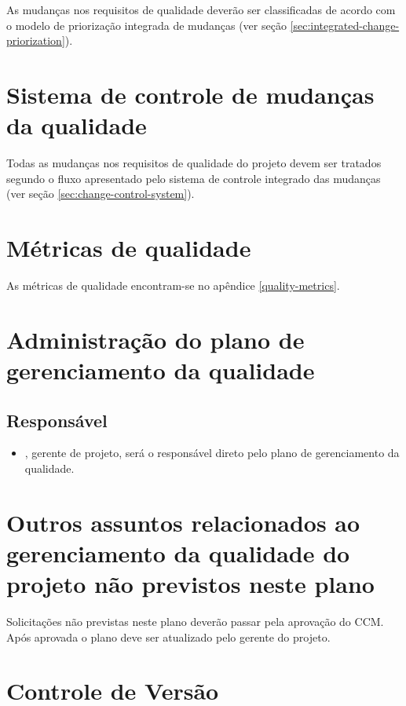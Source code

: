 As mudanças nos requisitos de qualidade deverão ser classificadas de acordo com o modelo de priorização integrada de mudanças (ver seção \ref{sec:integrated-change-priorization}).

\section{Sistema de controle de mudanças da qualidade}

Todas as mudanças nos requisitos de qualidade do projeto devem ser tratados segundo o fluxo apresentado pelo sistema de controle integrado das mudanças (ver seção \ref{sec:change-control-system}).

\section{Métricas de qualidade}

As métricas de qualidade encontram-se no apêndice \ref{quality-metrics}.

\section{Administração do plano de gerenciamento da qualidade}

\subsection{Responsável}

\begin{itemize}
	\item \projectManagerName{}, gerente de projeto, será o responsável direto pelo plano de gerenciamento da qualidade.
\end{itemize}

\section{Outros assuntos relacionados ao gerenciamento da qualidade do projeto não previstos neste plano}

Solicitações não previstas neste plano deverão passar pela aprovação do CCM. Após aprovada o plano deve ser atualizado pelo gerente do projeto.

\section{Controle de Versão}

